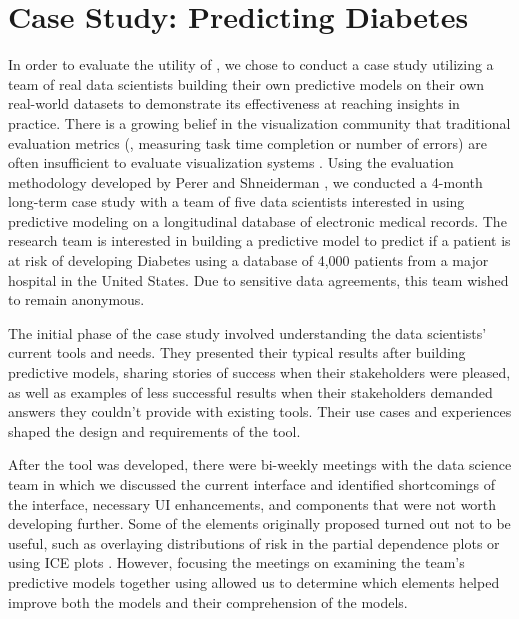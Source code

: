 
\section{Case Study: Predicting Diabetes}

In order to evaluate the utility of \prospector, we chose to conduct a case study utilizing a team of real data scientists building their own predictive models on their own real-world datasets to demonstrate its effectiveness at reaching insights in practice. There is a growing belief in the visualization community that traditional evaluation metrics (\eg, measuring task time completion or number of errors) are often insufficient to evaluate visualization systems \cite{bertini_summaries:_2011,plaisant_challenge_2004,shneiderman_strategies_2006}. Using the evaluation methodology developed by Perer and Shneiderman \cite{perer_integrating_2008}, we conducted a 4-month long-term case study with a team of five data scientists interested in using predictive modeling on a longitudinal database of electronic medical records. The research team is interested in building a predictive model to predict if a patient is at risk of developing Diabetes using a database of 4,000 patients from a major hospital in the United States.  Due to sensitive data agreements, this team wished to remain anonymous.  

The initial phase of the case study involved understanding the data scientists' current tools and needs.  They presented their typical results after building predictive models, sharing stories of success when their stakeholders were pleased, as well as examples of less successful results when their stakeholders demanded answers they couldn't provide with existing tools.  Their use cases and experiences shaped the design and requirements of the tool.

After the tool was developed, there were bi-weekly meetings with the data science team in which we discussed the current interface and identified shortcomings of the interface, necessary UI enhancements, and components that were not worth developing further.  Some of the elements originally proposed turned out not to be useful, such as overlaying distributions of risk in the partial dependence plots or using ICE plots \cite{goldstein14}.  However, focusing the meetings on examining the team's predictive models together using \prospector allowed us to determine which elements helped improve both the models and their comprehension of the models.

